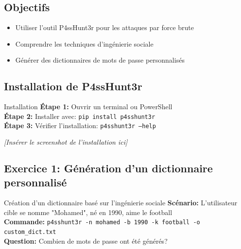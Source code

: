 \documentclass[12pt,a4paper]{article}
\begin{document}
\subsection{Objectifs}
\begin{itemize}
    \item Utiliser l'outil P4ssHunt3r pour les attaques par force brute
    \item Comprendre les techniques d'ingénierie sociale
    \item Générer des dictionnaires de mots de passe personnalisés
\end{itemize}

\subsection{Installation de P4ssHunt3r}

\begin{exercicebox}{Installation}
\textbf{Étape 1:} Ouvrir un terminal ou PowerShell\\
\textbf{Étape 2:} Installer avec: \texttt{pip install p4sshunt3r}\\
\textbf{Étape 3:} Vérifier l'installation: \texttt{p4sshunt3r --help}
\end{exercicebox}

\begin{answerbox}
\vspace{7cm}
\end{answerbox}

\begin{screenshotbox}
\centering
\textit{[Insérer le screenshot de l'installation ici]}
\end{screenshotbox}

\subsection{Exercice 1: Génération d'un dictionnaire personnalisé}

\begin{exercicebox}{Création d'un dictionnaire basé sur l'ingénierie sociale}
\textbf{Scénario:} L'utilisateur cible se nomme "Mohamed", né en 1990, aime le football\\
\textbf{Commande:} \texttt{p4sshunt3r -n mohamed -b 1990 -k football -o custom\_dict.txt}\\
\textbf{Question:} Combien de mots de passe ont été générés?
\end{exercicebox}
\end{document}
